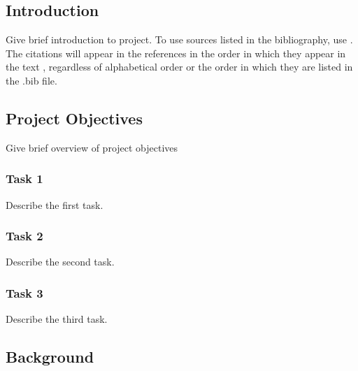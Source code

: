 \documentclass{article}
\begin{document}
\newpage %
\begin{doublespacing} %
\setcounter{page}{1} %

\section{Introduction} %

\noindent Give brief introduction to project. To use sources listed in the bibliography, use \cite{knuth:1984}. The citations \cite{latex:companion} will appear in the references \cite{latex2e} in the order in which they appear in the text \cite{texbook_label}, regardless of alphabetical order or the order in which they are listed in the .bib file.

\subsection{Project Objectives} %

\noindent Give brief overview of project objectives

\subsubsection{Task 1} %

\noindent Describe the first task. 

\subsubsection{Task 2} %

\noindent Describe the second task. 

\subsubsection{Task 3} %

\noindent Describe the third task. 

\subsection{Background} %


\end{doublespacing}
\end{document}

